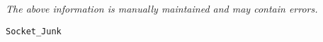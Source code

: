 \label{pkg:socket\_junk}

{\tiny \it The above information is manually maintained and may contain errors.}
\begin{verbatim}
Socket_Junk
\end{verbatim}
